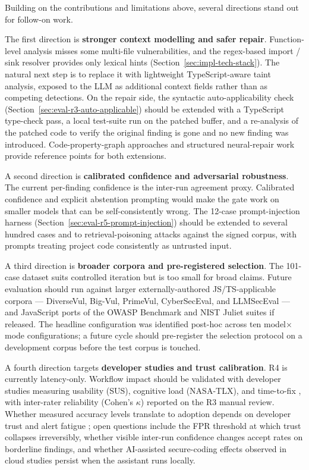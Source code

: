 Building on the contributions and limitations above, several directions stand out for follow-on work.

The first direction is \textbf{stronger context modelling and safer repair}. Function-level analysis misses some multi-file vulnerabilities, and the regex-based import / sink resolver provides only lexical hints (Section~\ref{sec:impl-tech-stack}). The natural next step is to replace it with lightweight TypeScript-aware taint analysis, exposed to the LLM as additional context fields rather than as competing detections. On the repair side, the syntactic auto-applicability check (Section~\ref{sec:eval-r3-auto-applicable}) should be extended with a TypeScript type-check pass, a local test-suite run on the patched buffer, and a re-analysis of the patched code to verify the original finding is gone and no new finding was introduced. Code-property-graph approaches \cite{yamaguchi2014cpg} and structured neural-repair work \cite{xia2022alpharepair} provide reference points for both extensions.

A second direction is \textbf{calibrated confidence and adversarial robustness}. The current per-finding confidence is the inter-run agreement proxy. Calibrated confidence \cite{kadavath2022know,spiess2024calibration} and explicit abstention prompting would make the gate work on smaller models that can be self-consistently wrong. The 12-case prompt-injection harness (Section~\ref{sec:eval-r5-prompt-injection}) should be extended to several hundred cases and to retrieval-poisoning attacks against the signed corpus, with prompts treating project code consistently as untrusted input.

A third direction is \textbf{broader corpora and pre-registered selection}. The 101-case dataset suits controlled iteration but is too small for broad claims. Future evaluation should run against larger externally-authored JS/TS-applicable corpora --- DiverseVul, Big-Vul, PrimeVul, CyberSecEval, and LLMSecEval \cite{chen2023diversevul,bhatt2023cyberseceval} --- and JavaScript ports of the OWASP Benchmark and NIST Juliet suites if released. The headline configuration was identified post-hoc across ten model$\times$mode configurations; a future cycle should pre-register the selection protocol on a development corpus before the test corpus is touched.

A fourth direction targets \textbf{developer studies and trust calibration}. R4 is currently latency-only. Workflow impact should be validated with developer studies measuring usability (SUS), cognitive load (NASA-TLX), and time-to-fix \cite{brooke1996sus,hart1988nasa}, with inter-rater reliability (Cohen's $\kappa$) reported on the R3 manual review. Whether measured accuracy levels translate to adoption depends on developer trust and alert fatigue \cite{johnson2013don,christakis2016developers}; open questions include the FPR threshold at which trust collapses irreversibly, whether visible inter-run confidence changes accept rates on borderline findings, and whether AI-assisted secure-coding effects observed in cloud studies \cite{perry2023users} persist when the assistant runs locally.

